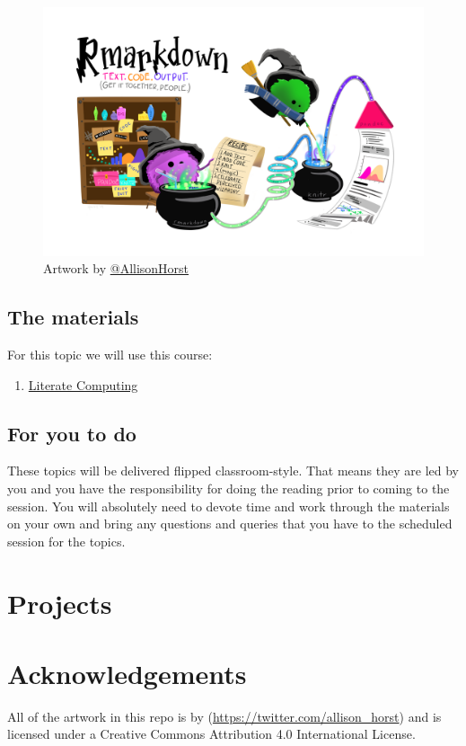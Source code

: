 \documentclass[
]{book}
\providecommand{\tightlist}{%
  \setlength{\itemsep}{0pt}\setlength{\parskip}{0pt}}
\begin{document}
\begin{figure}
\centering
\includegraphics{rmarkdown_wizards.png}
\caption{\label{fig:unnamed-chunk-7}Artwork by \href{https://github.com/allisonhorst}{@AllisonHorst}}
\end{figure}

\hypertarget{the-materials-6}{%
\section{The materials}\label{the-materials-6}}

For this topic we will use this course:

\begin{enumerate}
\def\labelenumi{\arabic{enumi}.}
\tightlist
\item
  \href{https://danmaclean.github.io/literate_computing/}{Literate Computing}
\end{enumerate}

\hypertarget{for-you-to-do-6}{%
\section{For you to do}\label{for-you-to-do-6}}

These topics will be delivered flipped classroom-style. That means they are led by you and you have the responsibility for doing the reading prior to coming to the session. You will absolutely need to devote time and work through the materials on your own and bring any questions and queries that you have to the scheduled session for the topics.

\hypertarget{projects}{%
\chapter{Projects}\label{projects}}

\hypertarget{acknowledgements}{%
\chapter{Acknowledgements}\label{acknowledgements}}

All of the artwork in this repo is by \citep[\textbackslash{}][]{allison_horst}(\url{https://twitter.com/allison_horst}) and is licensed under a Creative Commons Attribution 4.0 International License.

  
\end{document}
